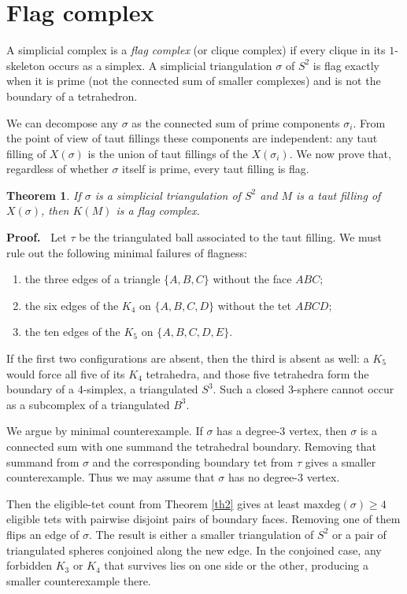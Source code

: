 \documentclass[12pt]{article}
\newtheorem{theorem}{Theorem}
\newcommand{\proofstart}{{\noindent \bf Proof.\ }}
\newcommand{\kw}{\mathrm}
\newcommand{\maxdeg}{\kw{maxdeg}}
\begin{document}
\section{Flag complex}

A simplicial complex is a \emph{flag complex}
(or clique complex) if every clique in its $1$-skeleton occurs as a
simplex.
A simplicial triangulation $\sigma$ of $S^2$
is flag exactly when it is prime
(not the connected sum of smaller complexes)
and is not the boundary of a tetrahedron.

We can decompose any $\sigma$ as the connected sum of
prime components $\sigma_i$.
From the point of view of taut fillings these components are independent:
any taut filling of $X(\sigma)$ is the union of taut fillings of the
$X(\sigma_i)$.
We now prove that, regardless of whether $\sigma$ itself is prime,
every taut filling is flag.

\begin{theorem} \label{th4}
If $\sigma$ is a simplicial triangulation of $S^2$ and $M$ is a taut
filling of $X(\sigma)$, then $K(M)$ is a flag complex.
\end{theorem}

\proofstart
Let $\tau$ be the triangulated ball associated to the taut filling.
We must rule out the following minimal failures of flagness:
\begin{enumerate}
\item
the three edges of a triangle $\{A,B,C\}$ without the face $ABC$;
\item
the six edges of the $K_4$ on $\{A,B,C,D\}$ without the tet $ABCD$;
\item
the ten edges of the $K_5$ on $\{A,B,C,D,E\}$.
\end{enumerate}

If the first two configurations are absent, then the third is absent as
well: a $K_5$ would force all five of its $K_4$ tetrahedra, and those
five tetrahedra form the boundary of a $4$-simplex, a triangulated
$S^3$. Such a closed $3$-sphere cannot occur as a subcomplex of a
triangulated $B^3$.

We argue by minimal counterexample.
If $\sigma$ has a degree-$3$ vertex, then $\sigma$ is a connected sum
with one summand the tetrahedral boundary.
Removing that summand from $\sigma$ and the corresponding boundary tet
from $\tau$ gives a smaller counterexample.
Thus we may assume that $\sigma$ has no degree-$3$ vertex.

Then the eligible-tet count from Theorem \ref{th2} gives at least
$\maxdeg(\sigma)\geq 4$ eligible tets with pairwise disjoint pairs of
boundary faces.
Removing one of them flips an edge of $\sigma$.
The result is either a smaller triangulation of $S^2$ or a pair of
triangulated spheres conjoined along the new edge.
In the conjoined case, any forbidden $K_3$ or $K_4$ that survives lies
on one side or the other, producing a smaller counterexample there.
\end{document}
